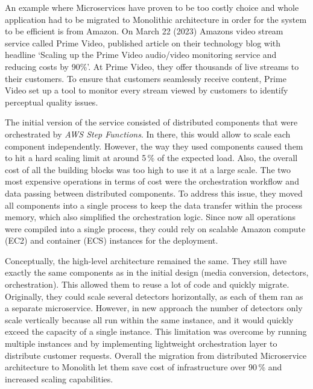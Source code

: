 \begin{example}
    An example where Microservices have proven to be too costly choice and whole application had to be migrated to Monolithic architecture in order for the system to be efficient is from Amazon. On March 22 (2023) Amazons video stream service called Prime Video, published article on their technology blog with headline `Scaling up the Prime Video audio/video monitoring service and reducing costs by 90\%'. At Prime Video, they offer thousands of live streams to their customers. To ensure that customers seamlessly receive content, Prime Video set up a tool to monitor every stream viewed by customers to identify perceptual quality issues. \cite{AMAZON_ARTICLE}

    The initial version of the service consisted of distributed components that were orchestrated by \textit{AWS Step Functions}. In there, this would allow to scale each component independently. However, the way they used components caused them to hit a hard scaling limit at around 5\,\% of the expected load. Also, the overall cost of all the building blocks was too high to use it at a large scale. The two most expensive operations in terms of cost were the orchestration workflow and data passing between distributed components. To address this issue, they moved all components into a single process to keep the data transfer within the process memory, which also simplified the orchestration logic. Since now all operations were compiled into a single process, they could rely on scalable Amazon compute (EC2) and container (ECS) instances for the deployment. \cite{AMAZON_ARTICLE}

    Conceptually, the high-level architecture remained the same. They still have exactly the same components as in the initial design (media conversion, detectors, orchestration). This allowed them to reuse a lot of code and quickly migrate. Originally, they could scale several detectors horizontally, as each of them ran as a separate microservice. However, in new approach the number of detectors only scale vertically because all run within the same instance, and it would quickly exceed the capacity of a single instance. This limitation was overcome by running multiple instances and by implementing lightweight orchestration layer to distribute customer requests. Overall the migration from distributed Microservice architecture to Monolith let them save cost of infrastructure over 90\,\% and increased scaling capabilities. \cite{AMAZON_ARTICLE}
\end{example}

